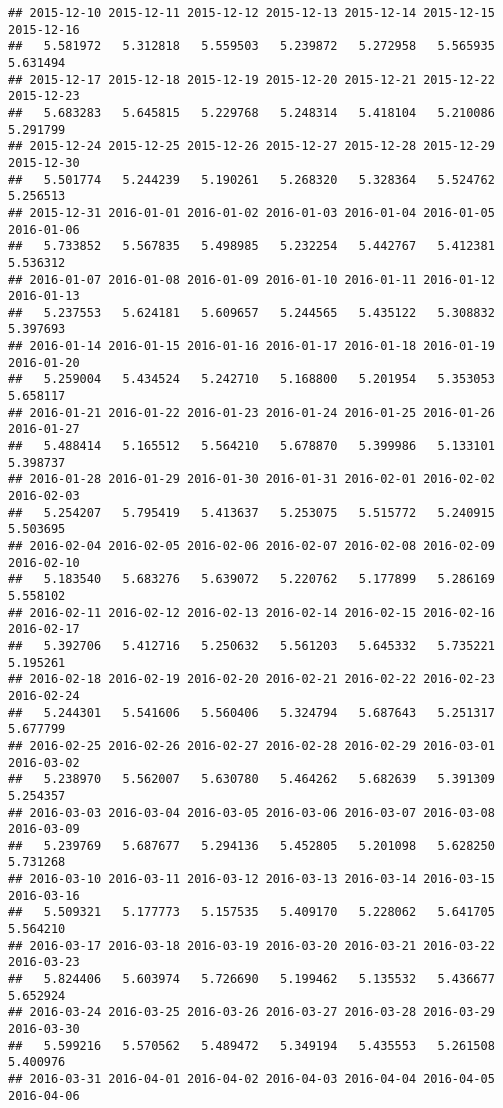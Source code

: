 \documentclass[
]{article}
\begin{document}
\begin{verbatim}
## 2015-12-10 2015-12-11 2015-12-12 2015-12-13 2015-12-14 2015-12-15 2015-12-16 
##   5.581972   5.312818   5.559503   5.239872   5.272958   5.565935   5.631494 
## 2015-12-17 2015-12-18 2015-12-19 2015-12-20 2015-12-21 2015-12-22 2015-12-23 
##   5.683283   5.645815   5.229768   5.248314   5.418104   5.210086   5.291799 
## 2015-12-24 2015-12-25 2015-12-26 2015-12-27 2015-12-28 2015-12-29 2015-12-30 
##   5.501774   5.244239   5.190261   5.268320   5.328364   5.524762   5.256513 
## 2015-12-31 2016-01-01 2016-01-02 2016-01-03 2016-01-04 2016-01-05 2016-01-06 
##   5.733852   5.567835   5.498985   5.232254   5.442767   5.412381   5.536312 
## 2016-01-07 2016-01-08 2016-01-09 2016-01-10 2016-01-11 2016-01-12 2016-01-13 
##   5.237553   5.624181   5.609657   5.244565   5.435122   5.308832   5.397693 
## 2016-01-14 2016-01-15 2016-01-16 2016-01-17 2016-01-18 2016-01-19 2016-01-20 
##   5.259004   5.434524   5.242710   5.168800   5.201954   5.353053   5.658117 
## 2016-01-21 2016-01-22 2016-01-23 2016-01-24 2016-01-25 2016-01-26 2016-01-27 
##   5.488414   5.165512   5.564210   5.678870   5.399986   5.133101   5.398737 
## 2016-01-28 2016-01-29 2016-01-30 2016-01-31 2016-02-01 2016-02-02 2016-02-03 
##   5.254207   5.795419   5.413637   5.253075   5.515772   5.240915   5.503695 
## 2016-02-04 2016-02-05 2016-02-06 2016-02-07 2016-02-08 2016-02-09 2016-02-10 
##   5.183540   5.683276   5.639072   5.220762   5.177899   5.286169   5.558102 
## 2016-02-11 2016-02-12 2016-02-13 2016-02-14 2016-02-15 2016-02-16 2016-02-17 
##   5.392706   5.412716   5.250632   5.561203   5.645332   5.735221   5.195261 
## 2016-02-18 2016-02-19 2016-02-20 2016-02-21 2016-02-22 2016-02-23 2016-02-24 
##   5.244301   5.541606   5.560406   5.324794   5.687643   5.251317   5.677799 
## 2016-02-25 2016-02-26 2016-02-27 2016-02-28 2016-02-29 2016-03-01 2016-03-02 
##   5.238970   5.562007   5.630780   5.464262   5.682639   5.391309   5.254357 
## 2016-03-03 2016-03-04 2016-03-05 2016-03-06 2016-03-07 2016-03-08 2016-03-09 
##   5.239769   5.687677   5.294136   5.452805   5.201098   5.628250   5.731268 
## 2016-03-10 2016-03-11 2016-03-12 2016-03-13 2016-03-14 2016-03-15 2016-03-16 
##   5.509321   5.177773   5.157535   5.409170   5.228062   5.641705   5.564210 
## 2016-03-17 2016-03-18 2016-03-19 2016-03-20 2016-03-21 2016-03-22 2016-03-23 
##   5.824406   5.603974   5.726690   5.199462   5.135532   5.436677   5.652924 
## 2016-03-24 2016-03-25 2016-03-26 2016-03-27 2016-03-28 2016-03-29 2016-03-30 
##   5.599216   5.570562   5.489472   5.349194   5.435553   5.261508   5.400976 
## 2016-03-31 2016-04-01 2016-04-02 2016-04-03 2016-04-04 2016-04-05 2016-04-06 

\end{verbatim}
\end{document}
